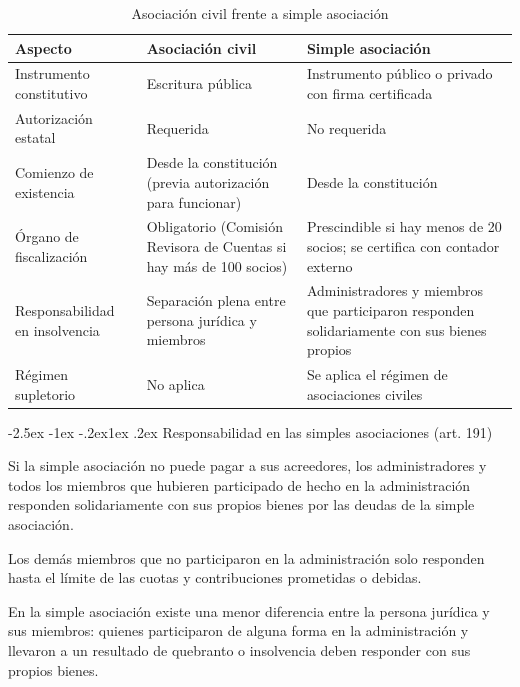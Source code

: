 \documentclass[12pt,oneside]{book}
\makeatletter
\renewcommand\subsection{\@startsection{subsection}{2}{\z@}%
  {-2.5ex \@plus -1ex \@minus -.2ex}{1ex \@plus .2ex}%
  {\normalfont\normalsize\bfseries}}
\makeatother
\begin{document}
\begin{table}[H]
\centering
\caption{Asociación civil frente a simple asociación}
\begin{tabularx}{\textwidth}{
    >{\raggedright\arraybackslash}p{}
    >{\raggedright\arraybackslash}X
    >{\raggedright\arraybackslash}X
}
\toprule
\textbf{Aspecto} & \textbf{Asociación civil} & \textbf{Simple asociación} \\
\midrule
Instrumento constitutivo & Escritura pública & Instrumento público o privado con firma certificada \\
Autorización estatal & Requerida & No requerida \\
Comienzo de existencia & Desde la constitución (previa autorización para funcionar) & Desde la constitución \\
Órgano de fiscalización & Obligatorio (Comisión Revisora de Cuentas si hay más de 100 socios) & Prescindible si hay menos de 20 socios; se certifica con contador externo \\
Responsabilidad en insolvencia & Separación plena entre persona jurídica y miembros & Administradores y miembros que participaron responden solidariamente con sus bienes propios \\
Régimen supletorio & No aplica & Se aplica el régimen de asociaciones civiles \\
\bottomrule
\end{tabularx}
\end{table}

\subsection{Responsabilidad en las simples asociaciones (art. 191)}

\begin{regla}
Si la simple asociación no puede pagar a sus acreedores, los administradores y todos los miembros que hubieren participado de hecho en la administración responden solidariamente con sus propios bienes por las deudas de la simple asociación.

Los demás miembros que no participaron en la administración solo responden hasta el límite de las cuotas y contribuciones prometidas o debidas.
\end{regla}

En la simple asociación existe una menor diferencia entre la persona jurídica y sus miembros: quienes participaron de alguna forma en la administración y llevaron a un resultado de quebranto o insolvencia deben responder con sus propios bienes.
\end{document}
